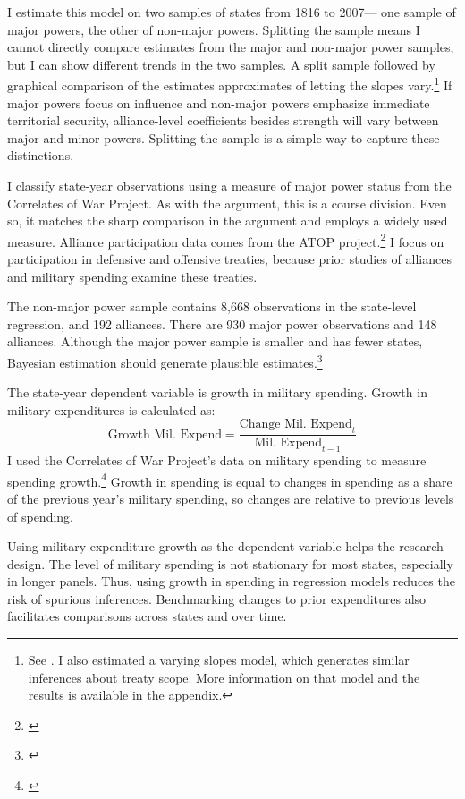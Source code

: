 \documentclass[12pt]{article}
\begin{document}
I estimate this model on two samples of states from 1816 to 2007--- one sample of major powers, the other of non-major powers. 
Splitting the sample means I cannot directly compare estimates from the major and non-major power samples, but I can show different trends in the two samples. 
A split sample followed by graphical comparison of the estimates approximates of letting the slopes vary.\footnote{See \citet{GelmanHill2007}. I also estimated a varying slopes model, which generates similar inferences about treaty scope. More information on that model and the results is available in the appendix.}
If major powers focus on influence and non-major powers emphasize immediate territorial security, alliance-level coefficients besides strength will vary between major and minor powers.
Splitting the sample is a simple way to capture these distinctions. 


I classify state-year observations using a measure of major power status from the Correlates of War Project. 
As with the argument, this is a course division. 
Even so, it matches the sharp comparison in the argument and employs a widely used measure. 
Alliance participation data comes from the ATOP project.\footnote{\citep{Leedsetal2002}} 
I focus on participation in defensive and offensive treaties, because prior studies of alliances and military spending examine these treaties. 


The non-major power sample contains 8,668 observations in the state-level regression, and 192 alliances. 
There are 930 major power observations and 148 alliances. 
Although the major power sample is smaller and has fewer states, Bayesian estimation should generate plausible estimates.\footnote{\citep{Stegmueller2013}} 


The state-year dependent variable is growth in military spending.
Growth in military expenditures is calculated as:
\begin{equation}
\mbox{Growth Mil. Expend} = \frac{ \mbox{Change Mil. Expend}_t }{ \mbox{Mil. Expend}_{t-1} }
\end{equation} 
I used the Correlates of War Project's data on military spending to measure spending growth.\footnote{\citep{SingerCINC1988}} 
Growth in spending is equal to changes in spending as a share of the previous year's military spending, so changes are relative to previous levels of spending. 


Using military expenditure growth as the dependent variable helps the research design. 
The level of military spending is not stationary for most states, especially in longer panels. 
Thus, using growth in spending in regression models reduces the risk of spurious inferences.
Benchmarking changes to prior expenditures also facilitates comparisons across states and over time. 
\end{document}
